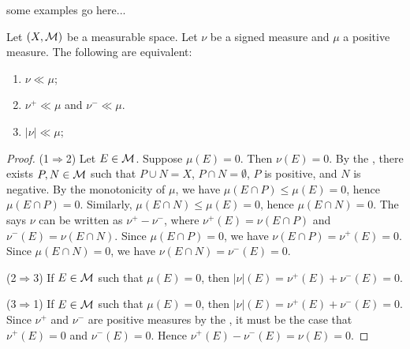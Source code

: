 \begin{example}
    {\color{red} some examples go here...}
\end{example}

\begin{lemma}
    Let $(X,\mathcal{M})$ be a measurable space. Let $\nu$ be a signed measure and $\mu$ a positive measure. The following are equivalent:
    \begin{enumerate}[label = (\arabic*),itemsep=1pt,topsep=3pt]
        \item $\nu \ll \mu$;
        \item $\nu^+ \ll \mu$ and $\nu^- \ll \mu$.
        \item $|\nu| \ll \mu$;
    \end{enumerate}
\end{lemma}
    \begin{proof}
        ({\small 1$\Rightarrow$2}) Let $E \in \mathcal{M}$. Suppose $\mu(E) = 0$. Then $\nu(E) = 0$. By the , there exists $P,N \in \mathcal{M}$ such that $P \cup N = X$, $P \cap N = \emptyset$, $P$ is positive, and $N$ is negative. By the monotonicity of $\mu$, we have $\mu(E \cap P) \leq \mu(E) = 0$, hence $\mu(E \cap P) = 0$. Similarly, $\mu(E \cap N) \leq \mu(E) = 0$, hence $\mu(E \cap N) = 0$. The  says $\nu$ can be written as $\nu^+ - \nu^-$, where $\nu^+(E) = \nu(E \cap P)$ and $\nu^-(E) = \nu(E \cap N)$. Since $\mu(E \cap P) = 0$, we have $\nu(E \cap P) = \nu^+(E) = 0$. Since $\mu(E \cap N) = 0$, we have $\nu(E \cap N) = \nu^-(E) = 0$.

        ({\small 2$\Rightarrow$3}) If $E \in \mathcal{M}$ such that $\mu(E) = 0$, then $|\nu|(E) = \nu^+(E) + \nu^-(E) = 0$.

        ({\small 3$\Rightarrow$1}) If $E \in \mathcal{M}$ such that $\mu(E) = 0$, then $|\nu|(E) = \nu^+(E) + \nu^-(E) = 0$. Since $\nu^+$ and $\nu^-$ are positive measures by the , it must be the case that $\nu^+(E) = 0$ and $\nu^-(E) = 0$. Hence $\nu^+(E) - \nu^-(E) = \nu(E) = 0$. 
    \end{proof}


